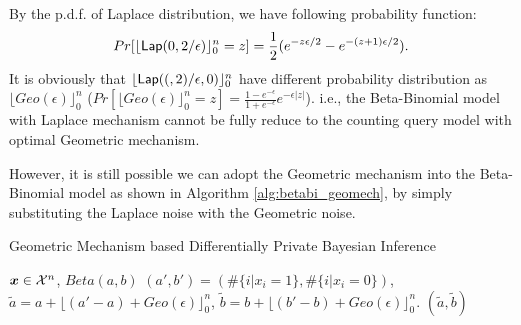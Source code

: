 \documentclass{article}
\begin{document}
By the p.d.f. of Laplace distribution, we have following probability function:
\[
	Pr[\lfloor \mathsf{Lap}(0, 2/\epsilon) \rfloor_0^{n} = z]
	= \frac{1}{2}(e^{-z\epsilon /2} - e^{-(z + 1)\epsilon / 2}).
\]
It is obviously that $\lfloor \mathsf{Lap}((, 2)/\epsilon, 0) \rfloor_0^{n}$ have different probability distribution as $\lfloor Geo(\epsilon) \rfloor_0^{n}$ 
($Pr[\lfloor Geo(\epsilon) \rfloor_0^{n} = z] = 
\frac{1 - e^{-\epsilon}}{1 + e^{-\epsilon}} e^{-\epsilon|z|}$).
i.e., the Beta-Binomial model with Laplace mechanism cannot be fully reduce to the counting query model 
with optimal Geometric mechanism.

However, it is still possible we can adopt the Geometric mechanism into the Beta-Binomial model as shown in Algorithm \ref{alg:betabi_geomech}, by simply substituting the Laplace noise with the Geometric noise.

\begin{algorithm}
  \caption{Geometric Mechanism based Differentially Private Bayesian Inference}
  \label{alg:betabi_geomech}
  \begin{algorithmic}
  \STATE $\boldsymbol{x}\in\mathcal{X}^n$, $Beta(a, b)$
  \STATE {} $(a', b') = (\#\{i | x_i = 1\}, \#\{i | x_i = 0\})$, 
  \STATE {} $\tilde{a} = a + \lfloor{(a' - a)+ Geo({\epsilon}) }\rfloor^n_0$,
  $\tilde{b} = b + \lfloor{(b' - b)+ Geo({{\epsilon}}) }\rfloor^n_0$.
   $(\tilde{a}, \tilde{b})$
  \end{algorithmic}
\end{algorithm}
%
\end{document}

